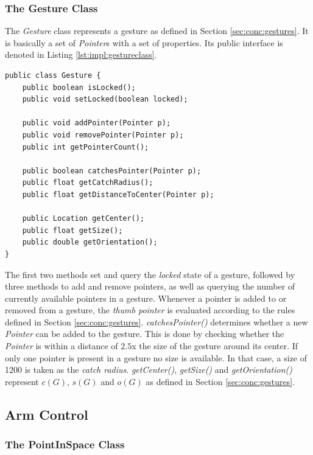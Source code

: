 \subsubsection{The Gesture Class}

The \textit{Gesture} class represents a gesture as defined in Section \ref{sec:conc:gestures}. It is basically a set of \textit{Pointer}s with a set of properties. Its public interface is denoted in Listing \ref{lst:impl:gestureclass}.

\begin{lstlisting}[caption={Public interface of the Gesture class},label=lst:impl:gestureclass]
public class Gesture {
	public boolean isLocked();
	public void setLocked(boolean locked);
	
	public void addPointer(Pointer p);
	public void removePointer(Pointer p);
	public int getPointerCount();
	
	public boolean catchesPointer(Pointer p);
	public float getCatchRadius();
	public float getDistanceToCenter(Pointer p);
	
	public Location getCenter();
	public float getSize();
	public double getOrientation();
}
\end{lstlisting}

The first two methods set and query the \textit{locked} state of a gesture, followed by three methods to add and remove pointers, as well as querying the number of currently available pointers in a gesture. Whenever a pointer is added to or removed  from a gesture, the \textit{thumb pointer} is evaluated according to the rules defined in Section \ref{sec:conc:gestures}.
\textit{catchesPointer()} determines whether a new \textit{Pointer} can be added to the gesture. This is done by checking whether the \textit{Pointer}  is within a distance of $2.5$x the size of the gesture around its center. If only one pointer is present in a gesture no size is available. In that case, a size of 1200 is taken as the \textit{catch radius}. \textit{getCenter()}, \textit{getSize()} and \textit{getOrientation()} represent $c(G)$, $s(G)$ and $o(G)$ as defined in Section \ref{sec:conc:gestures}.

\subsection{Arm Control}
\label{sec:impl:armcontrol}
\subsubsection{The PointInSpace Class}

